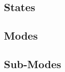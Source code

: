 
\subsection{States}
\label{sec:SaM_States}


% 

\subsection{Modes}
\label{sec:SaM_Modes}


\subsection{Sub-Modes}
\label{sec:SaM_SubModes}



